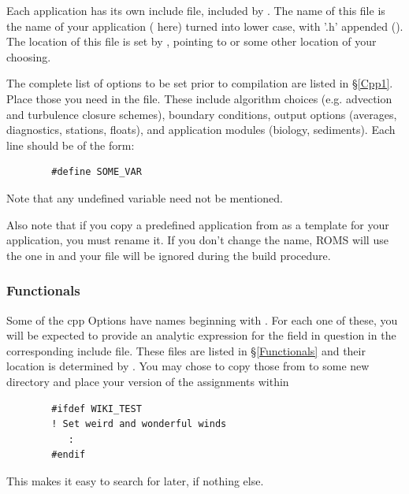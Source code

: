 Each application has its own include file, included by
. The name of this file is the name of your
application ( here) turned into lower case, with '.h'
appended (). The location of this file is set by
, pointing to  or some other
location of your choosing.

The complete list of options to be set prior to compilation are listed in
\S\ref{Cpp1}. Place those you need in the  file. These
include algorithm choices (e.g. advection and turbulence closure schemes),
boundary conditions, output options (averages, diagnostics, stations,
floats), and application modules (biology, sediments). Each line should
be of the form:
\begin{verbatim}
        #define SOME_VAR
\end{verbatim}
Note that any undefined variable need not be mentioned.

Also note that if you copy a predefined application from
 as a template for your application, you must
rename it. If you don't change the name, ROMS will use the one in
 and your file will be ignored during the build
procedure.

\subsubsection{Functionals}

Some of the cpp Options have names beginning with . For each one of
these, you will be expected to provide an analytic expression for the field
in question in the corresponding include file. These files
are listed in \S\ref{Functionals} and their location is determined
by . You may chose to copy those from
 to some new directory and place your version of
the assignments within
\begin{verbatim}
        #ifdef WIKI_TEST
        ! Set weird and wonderful winds
           :
        #endif
\end{verbatim}
This makes
it easy to search for later, if nothing else.

\subsubsection{}

